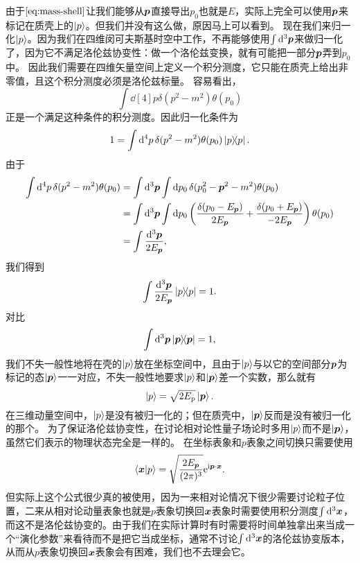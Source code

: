 \documentclass[hyperref, UTF8, a4paper]{ctexart}
\newcommand*{\ii}{\mathrm{i}}
\newcommand*{\ee}{\mathrm{e}}
\begin{document}
由于$\eqref{eq:mass-shell}$让我们能够从$\vb*{p}$直接导出$p_0$也就是$E$，实际上完全可以使用$\vb*{p}$来标记在质壳上的$\ket{p}$。但我们并没有这么做，原因马上可以看到。
现在我们来归一化$\ket{p}$。因为我们在四维闵可夫斯基时空中工作，不再能够使用$\int \dd[3]{\vb*{p}}$来做归一化了，因为它不满足洛伦兹协变性：做一个洛伦兹变换，就有可能把一部分$\vb*{p}$弄到$p_0$中。
因此我们需要在四维矢量空间上定义一个积分测度，它只能在质壳上给出非零值，且这个积分测度必须是洛伦兹标量。
容易看出，
\[
    \int \dd[4]{p} \delta(p^2 - m^2) \theta(p_0)
\]
正是一个满足这种条件的积分测度。因此归一化条件为
\[
    1 = \int \dd[4]{p} \delta(p^2 - m^2) \theta(p_0) \dyad{p}.
\]
由于
\[
    \begin{aligned}
        \int \dd[4]{p} \delta(p^2 - m^2) \theta(p_0) &= \int \dd[3]{\vb*{p}} \int \dd{p_0} \delta (p_0^2 - \vb*{p}^2 - m^2) \theta(p_0) \\
        &= \int \dd[3]{\vb*{p}} \int \dd{p_0} \left( \frac{\delta(p_0 - E_{\vb*{p}})}{2 E_{\vb*{p}}} + \frac{\delta(p_0 + E_{\vb*{p}})}{- 2 E_{\vb*{p}}} \right) \theta (p_0) \\
        &= \int \frac{\dd[3]{\vb*{p}}}{2 E_{\vb*{p}}},
    \end{aligned}
\]
我们得到
\[
    \int \frac{\dd[3]{\vb*{p}}}{2 E_{\vb*{p}}} \dyad{p} = 1.
\]
对比
\[
    \int \dd[3]{\vb*{p}} \dyad{\vb*{p}} = 1,
\]
我们不失一般性地将在壳的$\ket{p}$放在坐标空间中，且由于$\ket{p}$与以它的空间部分$\vb*{p}$为标记的态$\ket{\vb*{p}}$一一对应，不失一般性地要求$\ket{p}$和$\ket{\vb*{p}}$差一个实数，那么就有
\begin{equation}
    \ket{p} = \sqrt{2 E_{\text{p}}} \ket{\vb*{p}}.
    \label{eq:relativity-p}
\end{equation}
在三维动量空间中，$\ket{p}$是没有被归一化的；但在质壳中，$\ket{\vb*{p}}$反而是没有被归一化的那个。
为了保证洛伦兹协变性，在讨论相对论性量子场论时多用$\ket{p}$而不是$\ket{\vb*{p}}$，虽然它们表示的物理状态完全是一样的。
在坐标表象和$p$表象之间切换只需要使用
\begin{equation}
    \braket{\vb*{x}}{p} = \sqrt{\frac{2 E_{\vb*{p}}}{(2\pi)^3}} \ee^{\ii \vb*{p} \cdot \vb*{x}}.
    \label{eq:relativity-x-p-trans}
\end{equation}
但实际上这个公式很少真的被使用，因为一来相对论情况下很少需要讨论粒子位置，二来从相对论动量表象也就是$p$表象切换回$\vb*{x}$表象时需要使用积分测度$\int \dd[3]{\vb*{x}}$，而这不是洛伦兹协变的。由于我们在实际计算时有时需要将时间单独拿出来当成一个“演化参数”来看待而不是把它当成坐标，通常不讨论$\int \dd[3]{\vb*{x}}$的洛伦兹协变版本，从而从$p$表象切换回$\vb*{x}$表象会有困难，我们也不去理会它。
\end{document}
